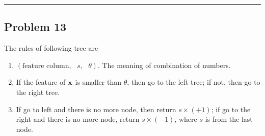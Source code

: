 \documentclass[12pt]{article}
\newcommand{\ParTh}[1]{\left(#1\right)}
\newcommand{\BF}[1]{{\bf#1}}
\newcommand{\horrule}[1]{\rule{\linewidth}{#1}}
\begin{document}
\horrule{0.5pt}

\subsection*{Problem 13}

The rules of following tree are
\begin{enumerate}
	\item $\ParTh{\text{feature column},\text{ }s,\text{ }\theta}$. The meaning of combination of numbers.
	\item If the feature of $\BF{x}$ is smaller than $\theta$, then go to the left tree; if not, then go to the right tree.
	\item If go to left and there is no more node, then return $s\times\ParTh{+1}$; if go to the right and there is no more node, return $s\times\ParTh{-1}$, where $s$ is from the last node.
\end{enumerate}

\end{document}
